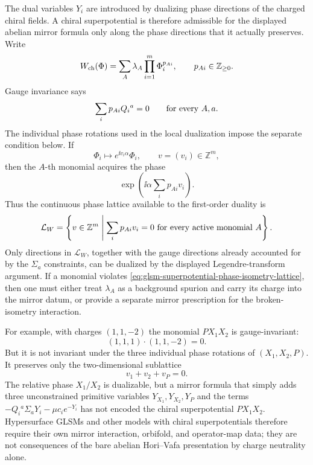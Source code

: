 \begin{construction}
\label{constr:glsm-chiral-superpotential-phase-isometry-lattice}
The dual variables \(Y_i\) are introduced by dualizing phase directions of the
charged chiral fields.  A chiral superpotential is therefore admissible for the
displayed abelian mirror formula only along the phase directions that it
actually preserves.  Write
\[
  W_{\rm ch}(\Phi)
  =
  \sum_A \lambda_A\prod_{i=1}^m\Phi_i^{p_{Ai}},
  \qquad p_{Ai}\in\mathbb Z_{\ge0}.
\]
Gauge invariance says
\[
  \sum_i p_{Ai}Q_i{}^a=0
  \qquad\hbox{for every }A,a.
\]
The individual phase rotations used in the local dualization impose the
separate condition below.  If
\[
  \Phi_i\longmapsto e^{\ii v_i\alpha}\Phi_i ,
  \qquad v=(v_i)\in\mathbb Z^m,
\]
then the \(A\)-th monomial acquires the phase
\[
  \exp\!\left(\ii\alpha\sum_i p_{Ai}v_i\right).
\]
Thus the continuous phase lattice available to the first-order duality is
\begin{equation}
  \mathcal L_W
  =
  \left\{
    v\in\mathbb Z^m\;\middle|\;
    \sum_i p_{Ai}v_i=0\ \hbox{for every active monomial }A
  \right\}.
  \label{eq:glsm-superpotential-phase-isometry-lattice}
\end{equation}
Only directions in \(\mathcal L_W\), together with the gauge directions already
accounted for by the \(\Sigma_a\) constraints, can be dualized by the displayed
Legendre-transform argument.  If a monomial violates
\eqref{eq:glsm-superpotential-phase-isometry-lattice}, then one must either
treat \(\lambda_A\) as a background spurion and carry its charge into the mirror
datum, or provide a separate mirror prescription for the broken-isometry
interaction.

For example, with charges \((1,1,-2)\) the monomial \(P X_1X_2\) is
gauge-invariant:
\[
  (1,1,1)\cdot(1,1,-2)=0.
\]
But it is not invariant under the three individual phase rotations of
\((X_1,X_2,P)\).  It preserves only the two-dimensional sublattice
\[
  v_1+v_2+v_P=0 .
\]
The relative phase \(X_1/X_2\) is dualizable, but a mirror formula that simply
adds three unconstrained primitive variables \(Y_{X_1},Y_{X_2},Y_P\) and the
terms \(-Q_i{}^a\Sigma_aY_i-\mu c_i e^{-Y_i}\) has not encoded the chiral
superpotential \(P X_1X_2\).  Hypersurface GLSMs and other models with chiral
superpotentials therefore require their own mirror interaction, orbifold, and
operator-map data; they are not consequences of the bare abelian Hori--Vafa
presentation by charge neutrality alone.
\end{construction}

